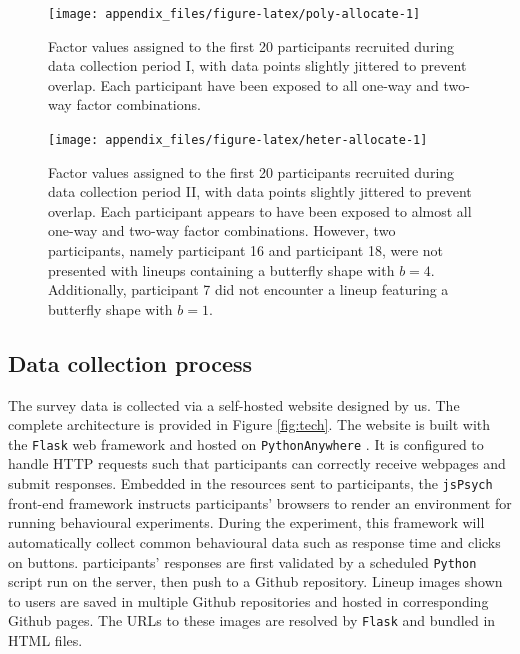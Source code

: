 \documentclass[]{interact}
\theoremstyle{plain}%
\theoremstyle{definition}
\theoremstyle{remark}
\begin{document}
\begin{figure}

{\centering \texttt{[image: appendix\_files/figure-latex/poly-allocate-1]} 

}

\caption{Factor values assigned to the first 20 participants recruited during data collection period I, with data points slightly jittered to prevent overlap. Each participant have been exposed to all one-way and two-way factor combinations.}\label{fig:poly-allocate}
\end{figure}

\begin{figure}

{\centering \texttt{[image: appendix\_files/figure-latex/heter-allocate-1]} 

}

\caption{Factor values assigned to the first 20 participants recruited during data collection period II, with data points slightly jittered to prevent overlap. Each participant appears to have been exposed to almost all one-way and two-way factor combinations. However, two participants, namely participant 16 and participant 18, were not presented with lineups containing a butterfly shape with $b = 4$. Additionally, participant 7 did not encounter a lineup featuring a butterfly shape with $b = 1$.}\label{fig:heter-allocate}
\end{figure}

\hypertarget{data-collection-process}{%
\subsection{Data collection process}\label{data-collection-process}}

The survey data is collected via a self-hosted website designed by us.
The complete architecture is provided in Figure \ref{fig:tech}. The
website is built with the \texttt{Flask} \citep{flask} web framework and
hosted on \texttt{PythonAnywhere} \citep{pythonanywhere}. It is
configured to handle HTTP requests such that participants can correctly
receive webpages and submit responses. Embedded in the resources sent to
participants, the \texttt{jsPsych} front-end framework \citep{jspsych}
instructs participants' browsers to render an environment for running
behavioural experiments. During the experiment, this framework will
automatically collect common behavioural data such as response time and
clicks on buttons. participants' responses are first validated by a
scheduled \texttt{Python} script run on the server, then push to a
Github repository. Lineup images shown to users are saved in multiple
Github repositories and hosted in corresponding Github pages. The URLs
to these images are resolved by \texttt{Flask} and bundled in HTML
files.
\end{document}
